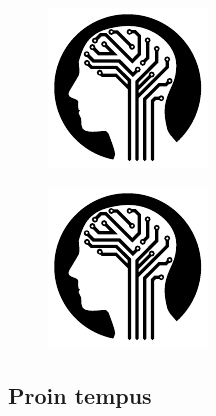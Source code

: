 			\begin{figure}
				\centering
				\begin{minipage}{.5\textwidth}
					\centering
					\includegraphics[page=1,width=0.7\linewidth]{figures/test.pdf}
					\label{fig:Test2}
				\end{minipage}%
				\begin{minipage}{.5\textwidth}
					\centering
					\includegraphics[page=1,width=0.7\linewidth]{figures/test.pdf}
					\label{fig:Test3}
				\end{minipage}
			\end{figure}
			
						
		\subsection{Proin tempus}
		
